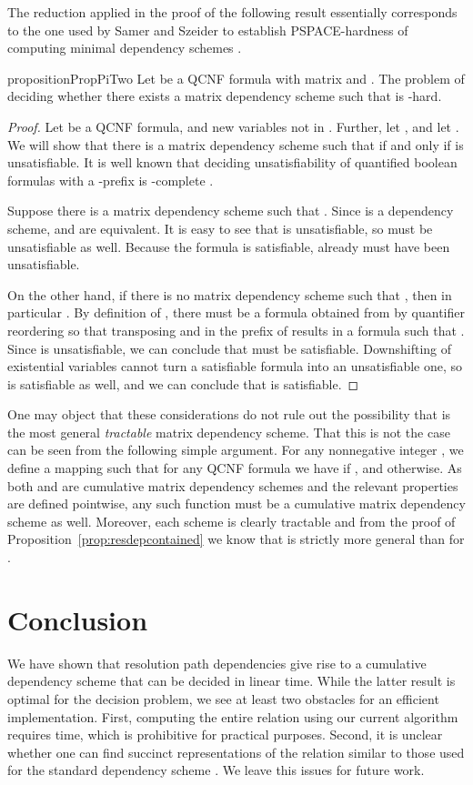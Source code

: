 \documentclass{llncs}
\newcommand{\longversion}[1]{#1}
\newcommand{\shortversion}[1]{}
\def\hy{\hbox{-}\nobreak\hskip0pt} \newcommand{\ellipsis}{}
\begin{document}
The reduction applied in the proof of the following result
essentially corresponds to the one used by Samer and Szeider to establish
PSPACE\hy hardness of computing minimal dependency schemes
\cite{SamerSzeider09a}.
\begin{restatable}{proposition}{PropPiTwo}\label{prop:piTwo}\shortversion{\textup{()}}
  Let  be a QCNF formula with matrix  and . The
  problem of deciding whether there exists a matrix dependency scheme  such
  that  is \hy hard.
\end{restatable}
\longversion{\begin{proof}
  Let 
  be a QCNF formula, and  new variables not in . Further, let
  , and let . We will show that there is a matrix dependency scheme 
  such that  if and only if  is unsatisfiable. It
  is well known that deciding unsatisfiability of quantified boolean formulas
  with a \hy prefix is \hy complete
  \cite{Stockmeyer76}.

  Suppose there is a matrix dependency scheme  such that . Since  is a dependency scheme,  and  are equivalent. It is easy to see that
   is unsatisfiable, so  must be unsatisfiable as well. Because
  the formula  is
  satisfiable, already  must have been unsatisfiable.

  On the other hand, if there is no matrix dependency scheme  such that
  , then in particular . By
  definition of , there must be a formula  obtained from
   by quantifier reordering so that transposing  and  in the prefix of  results in a formula  such that
  . Since  is unsatisfiable, we can conclude that  must
  be satisfiable. Downshifting of existential variables cannot turn a
  satisfiable formula into an unsatisfiable one, so  is satisfiable as
  well, and we can conclude that  is satisfiable.
\end{proof}
 }

One may object that these considerations do not rule out the possibility that
 is the most general \emph{tractable} matrix dependency scheme. That
this is not the case can be seen from the following simple argument. For any
nonnegative integer , we define a mapping  such that for any QCNF
formula  we have  if ,
and  otherwise. As both  and  are
cumulative matrix dependency schemes and the relevant properties are defined
pointwise, any such function  must be a cumulative matrix dependency
scheme as well. Moreover, each scheme  is clearly tractable and from the
proof of Proposition~\ref{prop:resdepcontained} we know that  is strictly
more general than  for .
\section{Conclusion}
We have shown that resolution path dependencies give rise to a cumulative
dependency scheme that can be decided in linear time. While the latter result
is optimal for the decision problem, we see at least two obstacles for an
efficient implementation. First, computing the entire relation 
using our current algorithm requires  time, which
is prohibitive for practical purposes. Second, it is unclear whether one can
find succinct representations of the relation  similar to those
used for the standard dependency scheme \cite{LonsingBiere2009}. We leave this
issues for future work.
\end{document}
